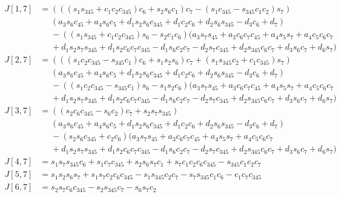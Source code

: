 \documentclass{article}
\begin{document}
\begin{align*}
\\
J[1,7] &= \left(\left(\left(s_{1} s_{345} + c_{1} c_{2} c_{345}\right) c_{6} + s_{2} s_{6} c_{1}\right) c_{7} - \left(s_{1} c_{345} - s_{345} c_{1} c_{2}\right) s_{7}\right) \\
       &\phantom{=}  \left(a_{3} s_{6} c_{45} + a_{4} s_{6} c_{5} + d_{1} s_{2} s_{6} c_{345} + d_{1} c_{2} c_{6} + d_{2} s_{6} s_{345} - d_{3} c_{6} + d_{7}\right) \\
       &\phantom{=}- \left(\left(s_{1} s_{345} + c_{1} c_{2} c_{345}\right) s_{6} - s_{2} c_{1} c_{6}\right) (a_{3} s_{7} s_{45} + a_{3} c_{6} c_{7} c_{45} + a_{4} s_{5} s_{7} + a_{4} c_{5} c_{6} c_{7} \\
       &\phantom{=}+ d_{1} s_{2} s_{7} s_{345} + d_{1} s_{2} c_{6} c_{7} c_{345}- d_{1} s_{6} c_{2} c_{7} - d_{2} s_{7} c_{345} + d_{2} s_{345} c_{6} c_{7} + d_{3} s_{6} c_{7} + d_{6} s_{7}) \\
J[2,7] &= \left(\left(\left(s_{1} c_{2} c_{345} - s_{345} c_{1}\right) c_{6} + s_{1} s_{2} s_{6}\right) c_{7} + \left(s_{1} s_{345} c_{2} + c_{1} c_{345}\right) s_{7}\right) \\
       &\phantom{=}  \left(a_{3} s_{6} c_{45} + a_{4} s_{6} c_{5} + d_{1} s_{2} s_{6} c_{345} + d_{1} c_{2} c_{6} + d_{2} s_{6} s_{345} - d_{3} c_{6} + d_{7}\right) \\
       &\phantom{=}- \left(\left(s_{1} c_{2} c_{345} - s_{345} c_{1}\right) s_{6} - s_{1} s_{2} c_{6}\right) (a_{3} s_{7} s_{45} + a_{3} c_{6} c_{7} c_{45} + a_{4} s_{5} s_{7} + a_{4} c_{5} c_{6} c_{7} \\
       &\phantom{=}+ d_{1} s_{2} s_{7} s_{345} + d_{1} s_{2} c_{6} c_{7} c_{345}- d_{1} s_{6} c_{2} c_{7} - d_{2} s_{7} c_{345} + d_{2} s_{345} c_{6} c_{7} + d_{3} s_{6} c_{7} + d_{6} s_{7}) \\
J[3,7] &= \left(\left(s_{2} c_{6} c_{345} - s_{6} c_{2}\right) c_{7} + s_{2} s_{7} s_{345}\right) \\
       &\phantom{=} \left(a_{3} s_{6} c_{45} + a_{4} s_{6} c_{5} + d_{1} s_{2} s_{6} c_{345} + d_{1} c_{2} c_{6} + d_{2} s_{6} s_{345} - d_{3} c_{6} + d_{7}\right) \\
       &\phantom{=}- \left(s_{2} s_{6} c_{345} + c_{2} c_{6}\right) (a_{3} s_{7} s_{45} + a_{3} c_{6} c_{7} c_{45} + a_{4} s_{5} s_{7} + a_{4} c_{5} c_{6} c_{7} \\
       &\phantom{=}+ d_{1} s_{2} s_{7} s_{345} + d_{1} s_{2} c_{6} c_{7} c_{345} - d_{1} s_{6} c_{2} c_{7} - d_{2} s_{7} c_{345} + d_{2} s_{345} c_{6} c_{7} + d_{3} s_{6} c_{7} + d_{6} s_{7}) \\
J[4,7] &= s_{1} s_{7} s_{345} c_{6} + s_{1} c_{7} c_{345} + s_{2} s_{6} s_{7} c_{1} + s_{7} c_{1} c_{2} c_{6} c_{345} - s_{345} c_{1} c_{2} c_{7} \\
J[5,7] &= s_{1} s_{2} s_{6} s_{7} + s_{1} s_{7} c_{2} c_{6} c_{345} - s_{1} s_{345} c_{2} c_{7} - s_{7} s_{345} c_{1} c_{6} - c_{1} c_{7} c_{345} \\
J[6,7] &= s_{2} s_{7} c_{6} c_{345} - s_{2} s_{345} c_{7} - s_{6} s_{7} c_{2}
\end{align*}
\end{document}
